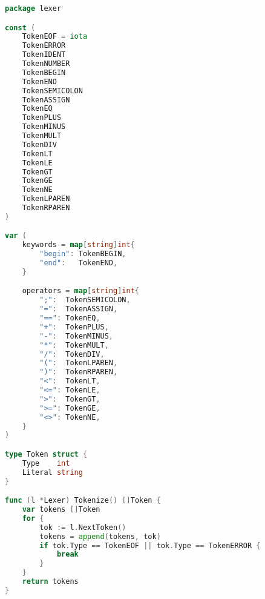 \begin{lstlisting}[language=Go, caption={Код модуля \textit{lexer}}]
package lexer

const (
	TokenEOF = iota
	TokenERROR
	TokenIDENT
	TokenNUMBER
	TokenBEGIN
	TokenEND
	TokenSEMICOLON
	TokenASSIGN
	TokenEQ
	TokenPLUS
	TokenMINUS
	TokenMULT
	TokenDIV
	TokenLT
	TokenLE
	TokenGT
	TokenGE
	TokenNE
	TokenLPAREN
	TokenRPAREN
)

var (
	keywords = map[string]int{
		"begin": TokenBEGIN,
		"end":   TokenEND,
	}

	operators = map[string]int{
		";":  TokenSEMICOLON,
		"=":  TokenASSIGN,
		"==": TokenEQ,
		"+":  TokenPLUS,
		"-":  TokenMINUS,
		"*":  TokenMULT,
		"/":  TokenDIV,
		"(":  TokenLPAREN,
		")":  TokenRPAREN,
		"<":  TokenLT,
		"<=": TokenLE,
		">":  TokenGT,
		">=": TokenGE,
		"<>": TokenNE,
	}
)

type Token struct {
	Type    int
	Literal string
}

func (l *Lexer) Tokenize() []Token {
	var tokens []Token
	for {
		tok := l.NextToken()
		tokens = append(tokens, tok)
		if tok.Type == TokenEOF || tok.Type == TokenERROR {
			break
		}
	}
	return tokens
}
\end{lstlisting}

